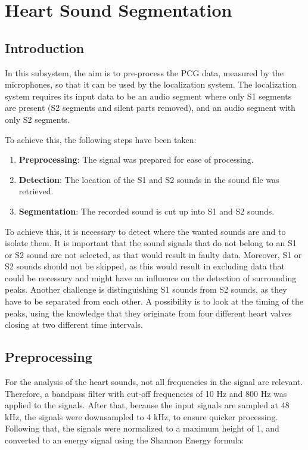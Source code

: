 \chapter{Heart Sound Segmentation}

\section{Introduction}

In this subsystem, the aim is to pre-process the PCG data, measured by the microphones, so that it can be used by the localization system. The localization system requires its input data to be an audio segment where only S1 segments are present (S2 segments and silent parts removed), and an audio segment with only S2 segments.

To achieve this, the following steps have been taken:
\begin{enumerate}
    \item \textbf{Preprocessing}: The signal was prepared for ease of processing.
    \item \textbf{Detection}: The location of the S1 and S2 sounds in the sound file was retrieved.
    \item \textbf{Segmentation}: The recorded sound is cut up into S1 and S2 sounds.
\end{enumerate}

To achieve this, it is necessary to detect where the wanted sounds are and to isolate them. It is important that the sound signals that do not belong to an S1 or S2 sound are not selected, as that would result in faulty data. Moreover, S1 or S2 sounds should not be skipped, as this would result in excluding data that could be necessary and might have an influence on the detection of surrounding peaks. Another challenge is distinguishing S1 sounds from S2 sounds, as they have to be separated from each other. A possibility is to look at the timing of the peaks, using the knowledge that they originate from four different heart valves closing at two different time intervals.


\section{Preprocessing}
For the analysis of the heart sounds, not all frequencies in the signal are relevant. Therefore, a bandpass filter with cut-off frequencies of 10 Hz and 800 Hz was applied to the signals. After that, because the input signals are sampled at 48 kHz, the signals were downsampled to 4 kHz, to ensure quicker processing. Following that, the signals were normalized to a maximum height of 1, and converted to an energy signal using the Shannon Energy formula:

